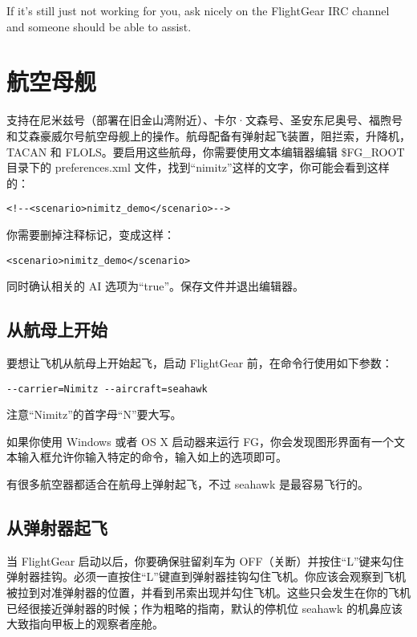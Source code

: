If it's still just not working for you, ask nicely on the FlightGear IRC channel and someone should be able to assist.
\fi

\ifchinese
\section{航空母舰}\label{carrier}

\FlightGear{} 支持在尼米兹号（部署在旧金山湾附近）、卡尔·文森号、圣安东尼奥号、福煦号和艾森豪威尔号航空母舰上的操作。航母配备有弹射起飞装置，阻拦索，升降机，TACAN 和 FLOLS。要启用这些航母，你需要使用文本编辑器编辑 \$FG\_ROOT 目录下的 preferences.xml 文件，找到“nimitz”这样的文字，你可能会看到这样的：

\begin{verbatim}
<!--<scenario>nimitz_demo</scenario>-->
\end{verbatim}

你需要删掉注释标记，变成这样：

\begin{verbatim}
<scenario>nimitz_demo</scenario>
\end{verbatim}

同时确认相关的 AI 选项为“true”。保存文件并退出编辑器。

\subsection{从航母上开始}

要想让飞机从航母上开始起飞，启动 FlightGear 前，在命令行使用如下参数：

\begin{verbatim}
--carrier=Nimitz --aircraft=seahawk
\end{verbatim}

注意“Nimitz”的首字母“N”要大写。

如果你使用 Windows 或者 OS X 启动器来运行 FG，你会发现图形界面有一个文本输入框允许你输入特定的命令，输入如上的选项即可。

有很多航空器都适合在航母上弹射起飞，不过 seahawk 是最容易飞行的。

\subsection{从弹射器起飞}

当 FlightGear 启动以后，你要确保驻留刹车为 OFF（关断）并按住“L”键来勾住弹射器挂钩。必须一直按住“L”键直到弹射器挂钩勾住飞机。你应该会观察到飞机被拉到对准弹射器的位置，并看到吊索出现并勾住飞机。这些只会发生在你的飞机已经很接近弹射器的时候；作为粗略的指南，默认的停机位 seahawk 的机鼻应该大致指向甲板上的观察者座舱。

